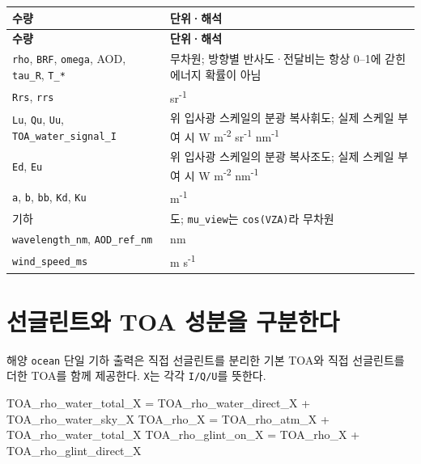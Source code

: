 {\TableFont
\begin{longtable}{@{}>{\raggedright\arraybackslash}p{}>{\raggedright\arraybackslash}p{}@{}}
\toprule
\textbf{수량} & \textbf{단위·해석} \\
\midrule
\endfirsthead
\toprule
\textbf{수량} & \textbf{단위·해석} \\
\midrule
\endhead
\bottomrule
\endfoot
\texttt{rho}, \texttt{BRF}, \texttt{omega}, AOD, \texttt{tau\_\allowbreak{}R}, \texttt{T\_\allowbreak{}*} & 무차원; 방향별 반사도·전달비는 항상 0--1에 갇힌 에너지 확률이 아님 \\
\texttt{Rrs}, \texttt{rrs} & sr\textsuperscript{-}\textsuperscript{1} \\
\texttt{Lu}, \texttt{Qu}, \texttt{Uu}, \texttt{TOA\_\allowbreak{}water\_\allowbreak{}signal\_\allowbreak{}I} & 위 입사광 스케일의 분광 복사휘도; 실제 스케일 부여 시 W m\textsuperscript{-}\textsuperscript{2} sr\textsuperscript{-}\textsuperscript{1} nm\textsuperscript{-}\textsuperscript{1} \\
\texttt{Ed}, \texttt{Eu} & 위 입사광 스케일의 분광 복사조도; 실제 스케일 부여 시 W m\textsuperscript{-}\textsuperscript{2} nm\textsuperscript{-}\textsuperscript{1} \\
\texttt{a}, \texttt{b}, \texttt{bb}, \texttt{Kd}, \texttt{Ku} & m\textsuperscript{-}\textsuperscript{1} \\
기하 & 도; \texttt{mu\_\allowbreak{}view}는 \texttt{cos(VZA)}라 무차원 \\
\texttt{wavelength\_\allowbreak{}nm}, \texttt{AOD\_\allowbreak{}ref\_\allowbreak{}nm} & nm \\
\texttt{wind\_\allowbreak{}speed\_\allowbreak{}ms} & m s\textsuperscript{-}\textsuperscript{1} \\
\end{longtable}
}

\section{선글린트와 TOA 성분을 구분한다}
\label{sec:auto:05_output_formats:3}
해양 \texttt{ocean} 단일 기하 출력은 직접 선글린트를 분리한 기본 TOA와 직접 선글린트를 더한 TOA를 함께 제공한다. \texttt{X}는 각각 \texttt{I/\allowbreak{}Q/\allowbreak{}U}를 뜻한다.


\begin{ManualCode}
TOA_rho_water_total_X = TOA_rho_water_direct_X + TOA_rho_water_sky_X
TOA_rho_X = TOA_rho_atm_X + TOA_rho_water_total_X
TOA_rho_glint_on_X = TOA_rho_X + TOA_rho_glint_direct_X
\end{ManualCode}


